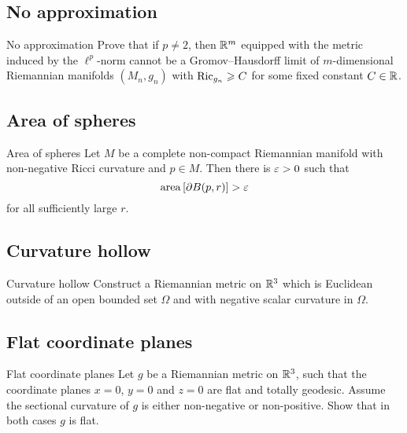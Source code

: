 \subsection*{No approximation\many}

\begin{pr}{\many}{No approximation}\label{No approximation}
Prove that 
if $p\not=2$,
then $\mathbb{R}^m$ 
equipped with the metric induced by the $\ell^p$-norm 
cannot be a
Gromov--Hausdorff limit of
$m$-dimensional Riemannian manifolds $(M_n,g_n)$ with $\Ric_{g_n}\z\ge C$ for some fixed constant $C\in\mathbb{R}$.
\end{pr}

\subsection*{Area of spheres}

\begin{pr}{}{Area of spheres}\label{Area of spheres}
Let $M$ be a complete non-compact Riemannian manifold 
with non-negative Ricci curvature and $p\in M$.
Then there is $\varepsilon>0$ such that 
$$\operatorname{\rm area}\left[\partial B(p,r)\right]>\varepsilon$$
for all sufficiently large $r$.
\end{pr}

\subsection*{Curvature hollow}

\begin{pr}{}{Curvature hollow}\label{Curvature hollow}
Construct a Riemannian metric on $\mathbb{R}^3$ 
which is Euclidean outside of an open bounded set $\Omega$ 
and with negative scalar curvature in $\Omega$.
\end{pr}

\subsection*{Flat coordinate planes}

\begin{pr}{}{Flat coordinate planes}\label{Flat coordinate planes}
Let $g$ be a Riemannian metric on $\mathbb{R}^3$,
such that the coordinate planes $x=0$, $y=0$ and $z=0$ are flat and totally geodesic.
Assume the sectional curvature of $g$ is either non-negative or non-positive.
Show that in both cases $g$ is flat. 
\end{pr}

